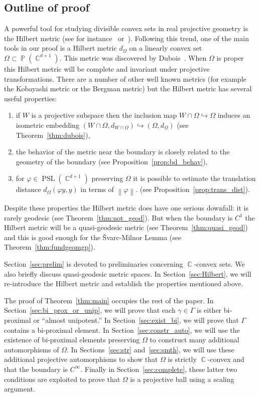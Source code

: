 \documentclass[12pt]{amsart}
\theoremstyle{plain}
\theoremstyle{definition}
\theoremstyle{remark}
\begin{document}
\subsection{Outline of proof} A powerful tool for studying divisible convex sets in real projective geometry is the Hilbert metric (see for instance~\cite{B2004} or~\cite{V1970}). Following this trend, one of the main tools in our proof is a Hilbert metric $d_\Omega$ on a linearly convex set $\Omega \subset \operatorname{\mathbb{P}}(\operatorname{\mathbb{C}}^{d+1})$. This metric was discovered by Dubois~\cite{D2009}. When $\Omega$ is proper this Hilbert metric will be complete and invariant under projective transformations. There are a number of other well known metrics (for example the Kobayashi metric or the Bergman metric) but the Hilbert metric has several useful properties:
\begin{enumerate}
\item if $W$ is a projective subspace then the inclusion map $W \cap \Omega \hookrightarrow \Omega$ induces an isometric embedding $(W \cap \Omega, d_{W \cap \Omega}) \hookrightarrow (\Omega, d_{\Omega})$ (see Theorem~\ref{thm:dubois}),
\item the behavior of the metric near the boundary is closely related to the geometry of the boundary (see Proposition~\ref{prop:bd_behav}), 
\item for $\varphi \in \operatorname{PSL}(\operatorname{\mathbb{C}}^{d+1})$ preserving $\Omega$ it is possible to estimate the translation distance $d_{\Omega}(\varphi y, y)$ in terms of ${\left\|{\varphi}\right\|}$.
(see Proposition~\ref{prop:trans_dist}). 
\end{enumerate}
Despite these properties the Hilbert metric does have one serious downfall: it is rarely geodesic (see Theorem~\ref{thm:not_geod}). But when the boundary is $C^1$ the Hilbert metric will be a quasi-geodesic metric (see Theorem~\ref{thm:quasi_geod}) and this is good enough for the  \v{S}varc-Milnor Lemma (see Theorem~\ref{thm:fundgeomgp}).

Section~\ref{sec:prelim} is devoted to preliminaries concerning $\operatorname{\mathbb{C}}$-convex sets. We also briefly discuss quasi-geodesic metric spaces. In Section~\ref{sec:Hilbert}, we will re-introduce the Hilbert metric and establish the properties mentioned above. 

The proof of Theorem~\ref{thm:main} occupies the rest of the paper. In Section~\ref{sec:bi_prox_or_unip}, we will  prove that each $\gamma \in \Gamma$ is either bi-proximal or ``almost unipotent.'' In Section~\ref{sec:exist_bi}, we will prove that $\Gamma$ contains a bi-proximal element. In Section~\ref{sec:constr_auto}, we will use the existence of bi-proximal elements preserving $\Omega$  to construct many additional automorphisms of $\Omega$. In Sections~\ref{sec:str} and~\ref{sec:smth}, we will use these additional projective automorphisms to show that $\Omega$ is strictly $\operatorname{\mathbb{C}}$-convex and that the boundary is $C^\infty$. Finally in Section~\ref{sec:complete}, these latter two conditions are exploited to prove that $\Omega$ is a projective ball using a scaling argument. 
\end{document}
